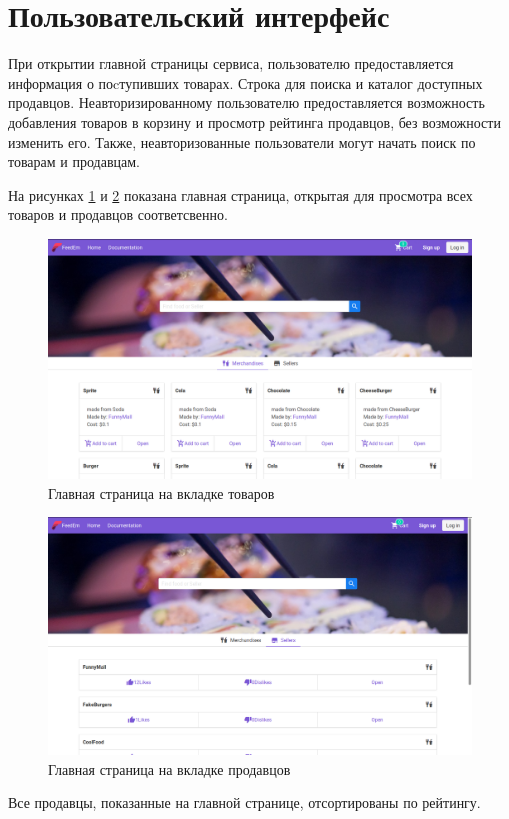 \section{Пользовательский интерфейс}
{
  При открытии главной страницы сервиса, пользователю предоставляется информация о
  поcтупивших товарах. Строка для поиска и каталог доступных продавцов.
  Неавторизированному пользователю предоставляется возможность добавления товаров
  в корзину и просмотр рейтинга продавцов, без возможности изменить его.
  Также, неавторизованные пользователи могут начать поиск по товарам и продавцам.

  На рисунках \ref{view_home_merch} и \ref{view_home_sellers} показана главная страница,
  открытая для просмотра всех товаров и продавцов соответсвенно.

  \begin{figure}[H]
    \centering
  	\includegraphics[width=\textwidth]{Home.png}
  	\caption{Главная страница на вкладке товаров}
  	\label{view_home_merch}
  \end{figure}

  \begin{figure}[H]
    \centering
    \includegraphics[width=\textwidth]{home_sellers.png}
    \caption{Главная страница на вкладке продавцов}
    \label{view_home_sellers}
  \end{figure}
  Все продавцы, показанные на главной странице, отсортированы по рейтингу.

}
